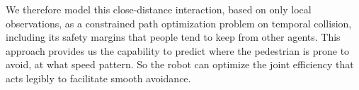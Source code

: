\documentclass[conference]{IEEEtran}
\begin{document}
We therefore model this close-distance interaction, based on only local 
observations, as a constrained path optimization problem on temporal 
collision, including its safety margins that people tend to keep from other 
agents. This approach provides us the capability to predict where the 
pedestrian is prone to avoid, at what speed pattern. So the robot can optimize 
the joint efficiency that acts legibly to facilitate smooth avoidance. 



\end{document}

